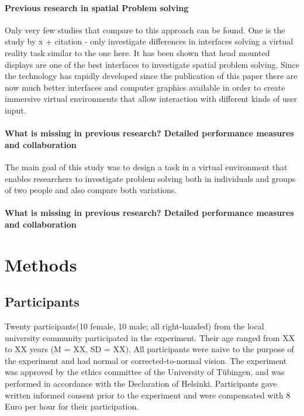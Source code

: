 \documentclass{article}
\begin{document}
\paragraph{Previous research in spatial Problem solving}
Only very few studies that compare to this approach can be found. One is the study by x + citation
- only investigate differences in interfaces solving a virtual reality task similar to the one here. It has been shown that head mounted displays are one of the best interfaces to investigate spatial problem solving. Since the technology has rapidly developed since the publication of this paper there are now much better interfaces and computer graphics available in order to create immersive virtual environments that allow interaction with different kinds of user input.
\paragraph{What is missing in previous research? Detailed performance measures and collaboration}
 The main goal of this study was to design a task in a virtual environment that enables researchers to investigate problem solving both in individuals and groups of two people and also compare both variations.

\paragraph{What is missing in previous research? Detailed performance measures and collaboration}


\section{Methods}

\subsection{Participants}
Twenty participants(10 female, 10 male; all right-handed) from the local university community participated in the experiment. Their age ranged from XX to XX years (M = XX, SD = XX). All participants were naive to the purpose of the experiment and had normal or corrected-to-normal vision. The experiment was approved by the ethics committee of the University of T\"ubingen, and was performed in accordance with the Declaration of Helsinki. Participants gave written informed consent prior to the experiment and were compensated with 8 Euro per hour for their participation. 
\end{document}
